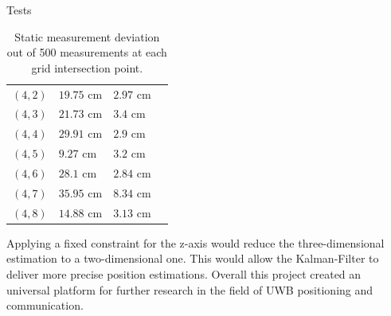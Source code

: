 \documentclass[final]{beamer}
\newlength{\sepwidth}
\newlength{\colwidth}
\newcommand{\separatorcolumnwithoutline}{\begin{column}{\sepwidth}\end{column}}
\begin{document}
\begin{frame}[t]
\begin{columns}[t]
\begin{column}{\colwidth}
\begin{block}{Tests}
\begin{table}[hbt!]
\begin{tabular}{l l l c}
        $(4,2)$ & $19.75$ cm & $2.97$ cm\\
        $(4,3)$ & $21.73$ cm & $3.4$ cm\\
        $(4,4)$ & $29.91$ cm & $2.9$ cm\\
        $(4,5)$ & $9.27$ cm & $3.2$ cm\\
        $(4,6)$ & $28.1$ cm & $2.84$ cm\\
        $(4,7)$ & $35.95$ cm & $8.34$ cm\\
        $(4,8)$ & $14.88$ cm & $3.13$ cm\\
    
    
        
      \end{tabular}
      \caption{Static measurement deviation out of 500 measurements at each grid intersection point.}
      \label{table:measurements}
    \end{table}

    Applying a fixed constraint for the z-axis would reduce the three-dimensional estimation
    to a two-dimensional one.
    This would allow the Kalman-Filter to deliver more precise position estimations.
    Overall this project created an universal platform for further research in the field of UWB positioning and communication.

  \end{block}
\end{column}

\separatorcolumnwithoutline
\end{columns}
\end{frame}
\end{document}
